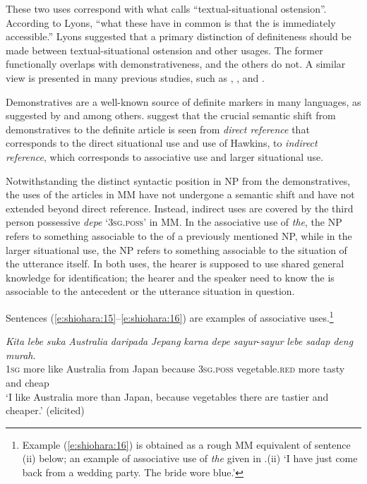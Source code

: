\documentclass[output=paper
,modfonts
,nonflat]{langsci/langscibook}
\begin{document}
\noindent
These two uses correspond with what \citet[166, 198]{Lyons1999} calls “textual-situational ostension”. According to Lyons, “what these have in common is that the  is immediately accessible.” Lyons suggested that a primary distinction of definiteness should be made between textual-situational ostension and other usages. The former functionally overlaps with demonstrativeness, and the others do not. A similar view is presented in many previous studies, such as \citet[Chapter 3] {Hawkins2015}, \citet{Himmelmann1996}, and \citet[528]{deMulder2011}. 

Demonstratives are a well-known source of definite markers in many languages, as suggested by \citet{Heine2002} and \citet{Lyons1999} among others. \citet[528]{deMulder2011} suggest that the crucial semantic shift from demonstratives to the definite article is seen from \textit{direct reference} that corresponds to the direct situational use and  use of Hawkins, to \textit{indirect reference}, which corresponds to  associative use and larger situational use. 

Notwithstanding the distinct syntactic position in NP from the demonstratives, the uses of the articles in MM have not undergone a semantic shift and have not extended beyond direct reference. Instead, indirect uses are covered by the third person possessive \textit{depe} ‘\textsc{3sg.poss’} in MM. In the  associative use of \textit{the}, the NP refers to something associable to the  of a previously mentioned NP, while in the larger situational use, the NP refers to something associable to the situation of the utterance itself. In both uses, the hearer is supposed to use shared general knowledge for identification; the hearer and the speaker need to know the  is associable to the antecedent or the utterance situation in question.

Sentences (\ref{e:shiohara:15}--\ref{e:shiohara:16}) are examples of  associative uses.\footnote{Example (\ref{e:shiohara:16}) is obtained as a rough MM equivalent of sentence (ii) below; an example of associative  use of  \textit{the} given in \citet[3]{Lyons1999}.(ii) ‘I have just come back from a wedding party. The bride wore blue.’}

\begin{exe}
	\ex\label{e:shiohara:15}
	\gll \textit{Kita}  \textit{lebe}  \textit{suka}  \textit{Australia}  \textit{daripada}   \textit{Jepang} \textit{karna}   \textit{depe}     \textit{sayur}-\textit{sayur}   \textit{lebe}   \textit{sadap}  \textit{deng}  \textit{murah}.\\
	\textsc{1sg}  more  like  Australia  from    Japan  because \textsc{3sg.poss} vegetable.\textsc{red} more  tasty  and   cheap\\
	\glt ‘I like Australia more than Japan, because vegetables there are tastier and cheaper.’ \hfill{(elicited)}
\end{exe}
\end{document}
